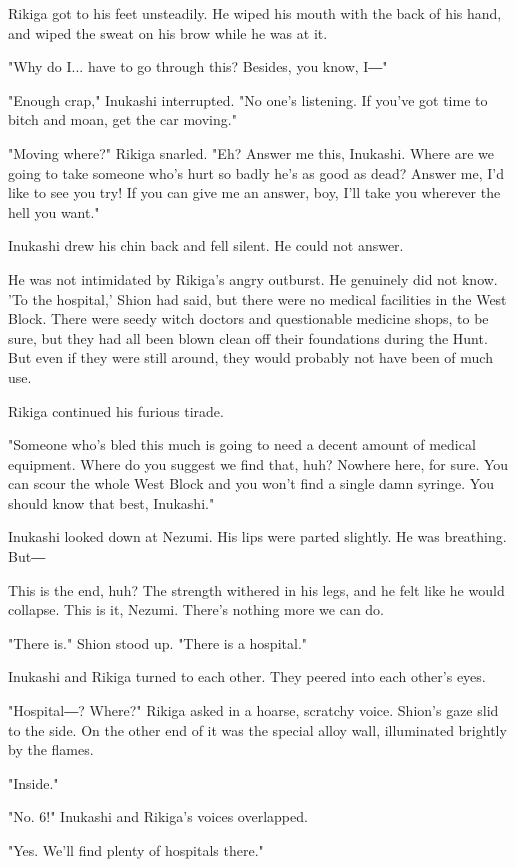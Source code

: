 Rikiga got to his feet unsteadily. He wiped his mouth with the back of
his hand, and wiped the sweat on his brow while he was at it.

"Why do I... have to go through this? Besides, you know, I―"

"Enough crap," Inukashi interrupted. "No one's listening. If you've got
time to bitch and moan, get the car moving."

"Moving where?" Rikiga snarled. "Eh? Answer me this, Inukashi. Where are
we going to take someone who's hurt so badly he's as good as dead?
Answer me, I'd like to see you try! If you can give me an answer, boy,
I'll take you wherever the hell you want."

Inukashi drew his chin back and fell silent. He could not answer.

He was not intimidated by Rikiga's angry outburst. He genuinely did not
know. 'To the hospital,' Shion had said, but there were no medical
facilities in the West Block. There were seedy witch doctors and
questionable medicine shops, to be sure, but they had all been blown
clean off their foundations during the Hunt. But even if they were still
around, they would probably not have been of much use.

Rikiga continued his furious tirade.

"Someone who's bled this much is going to need a decent amount of
medical equipment. Where do you suggest we find that, huh? Nowhere here,
for sure. You can scour the whole West Block and you won't find a single
damn syringe. You should know that best, Inukashi."

Inukashi looked down at Nezumi. His lips were parted slightly. He was
breathing. But―

This is the end, huh? The strength withered in his legs, and he felt
like he would collapse. This is it, Nezumi. There's nothing more we can
do.

"There is." Shion stood up. "There is a hospital."

Inukashi and Rikiga turned to each other. They peered into each other's
eyes.

"Hospital―? Where?" Rikiga asked in a hoarse, scratchy voice. Shion's
gaze slid to the side. On the other end of it was the special alloy
wall, illuminated brightly by the flames.

"Inside."

"No. 6!" Inukashi and Rikiga's voices overlapped.

"Yes. We'll find plenty of hospitals there."

